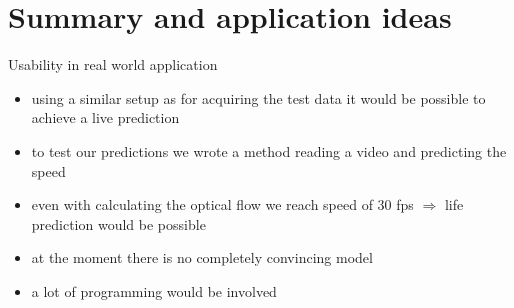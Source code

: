 \section{Summary and application ideas}

\begin{frame}{Usability in real world application}
	\begin{itemize}
		\item using a similar setup as for acquiring the test data it would be possible to achieve a live prediction
		\item to test our predictions we wrote a method reading a video and predicting the speed
		\item even with calculating the optical flow we reach speed of 30 fps $\Rightarrow$ life prediction would be possible
		\item at the moment there is no completely convincing model
		\item a lot of programming would be involved
	\end{itemize}
\end{frame}